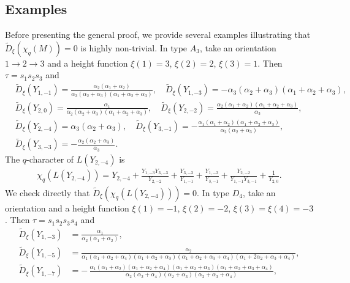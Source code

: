 \documentclass[12pt]{amsart}
\theoremstyle{plain}
\theoremstyle{definition}
\numberwithin{equation}{section}
\newcommand{\td}{{\widetilde{D}}}
\newcommand{\tdxi}{\widetilde{D}_{\xi}}
\begin{document}
\subsection{Examples}
Before presenting the general proof, we provide several examples illustrating that $\tdxi \left( \chi_q(M) \right) = 0$ is highly non-trivial. In type $A_3$, take an orientation $1 \to 2 \to 3$ and a height function $\xi(1)=3$, $\xi(2)=2$, $\xi(3)=1$. Then $\tau=s_1s_2s_3$ and 
\begin{align*}
& \td_{\xi}(Y_{1,-1}) =
\frac{\alpha_2 (\alpha_1 + \alpha_2)}
     {\alpha_3 (\alpha_2 + \alpha_3) (\alpha_1 + \alpha_2 + \alpha_3)}, \quad 
\td_{\xi}(Y_{1,-3}) =
- \alpha_3 (\alpha_2 + \alpha_3) (\alpha_1 + \alpha_2 + \alpha_3), \\ 
%
& \td_{\xi}(Y_{2,0}) =
\frac{\alpha_1}
     {\alpha_2 (\alpha_2 + \alpha_3) (\alpha_1 + \alpha_2 + \alpha_3)}, \quad 
\td_{\xi}(Y_{2,-2}) =
\frac{\alpha_2 (\alpha_1 + \alpha_2) (\alpha_1 + \alpha_2 + \alpha_3)}
     {\alpha_3}, \\ 
& \td_{\xi}(Y_{2,-4}) =
\alpha_3 (\alpha_2 + \alpha_3), \quad 
\td_{\xi}(Y_{3,-1}) =
- \frac{\alpha_1 (\alpha_1 + \alpha_2) (\alpha_1 + \alpha_2 + \alpha_3)}
        {\alpha_2 (\alpha_2 + \alpha_3)}, \\ 
& \td_{\xi}(Y_{3,-3}) =
- \frac{\alpha_2 (\alpha_2 + \alpha_3)}
        {\alpha_3}.
\end{align*}
The $q$-character of $L(Y_{2,-4})$ is
\begin{align*}
\chi_q(L(Y_{2,-4})) = Y_{2,-4}
+ \frac{Y_{1,-3} Y_{3,-3}}{Y_{2,-2}}
+ \frac{Y_{3,-3}}{Y_{1,-1}}
+ \frac{Y_{1,-3}}{Y_{3,-1}}
+ \frac{Y_{2,-2}}{Y_{1,-1} Y_{3,-1}}
+ \frac{1}{Y_{2,0}}. 
\end{align*}
We check directly that $\td_{\xi}(\chi_q(L(Y_{2,-4})))=0$. 
In type $D_4$, take an orientation  and a height function $\xi(1)=-1$, $\xi(2)=-2$, $\xi(3)=\xi(4)=-3$. Then $\tau=s_1s_2s_3s_4$ and 
\begin{align*}
\td_{\xi}(Y_{1,-3}) &=
\frac{\alpha_1}{\alpha_2 (\alpha_1 + \alpha_2)}, \\
%
\td_{\xi}(Y_{1,-5}) &=
\frac{\alpha_2}
     {\alpha_1 (\alpha_1 + \alpha_2 + \alpha_4) (\alpha_1 + \alpha_2 + \alpha_3)
      (\alpha_1 + \alpha_2 + \alpha_3 + \alpha_4) (\alpha_1 + 2\alpha_2 + \alpha_3 + \alpha_4)}, \\
%
\td_{\xi}(Y_{1,-7}) &=
-\,\frac{
\alpha_1 (\alpha_1 + \alpha_2) (\alpha_1 + \alpha_2 + \alpha_4) (\alpha_1 + \alpha_2 + \alpha_3)
(\alpha_1 + \alpha_2 + \alpha_3 + \alpha_4)
}{
\alpha_2 (\alpha_2 + \alpha_4) (\alpha_2 + \alpha_3) (\alpha_2 + \alpha_3 + \alpha_4)
}, 
\end{align*}
\end{document}
